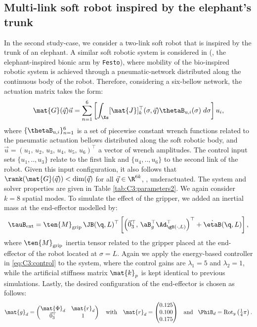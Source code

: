\subsection{Multi-link soft robot inspired by the elephant's trunk}
In the second study-case, we consider a two-link soft robot that is inspired by the trunk of an elephant. A similar soft robotic system is considered in \cite{Falkenhahn2015} (\ie, the elephant-inspired bionic arm by \texttt{Festo}), where mobility of the bio-inspired robotic system is achieved through a pneumatic-network distributed along the continuous body of the robot. Therefore, considering a six-bellow network, the actuation matrix takes the form:
%
\begin{equation*}
\mat{G}(\vec{q})\vec{u} = \sum_{n=1}^6 \left[ \int_\Xs [\mat{J}]_k^\top(\sigma,\vec{q}) \thetaB_{\textrm{u},i}(\sigma)\; d\sigma\right] u_i,
\end{equation*}
%
where $\{\thetaB_{\textrm{u},i}\}_{n=1}^6$ is a set of piecewise constant wrench functions related to the pneumatic actuation bellows distributed along the soft robotic body, and $\vec{u} = (u_1,\,u_2,\,u_3,\,u_4,\,u_5,\,u_6)^\top$ a vector of wrench amplitudes. The control input sets $\{u_1,..,u_3\}$ relate to the first link and $\{u_4,..,u_6\}$ to the second link of the robot. Given this input configuration, it also follows that $\rank(\mat{G}(\vec{q})) < \dim(\vec{q})$ for all $\vec{q} \in \R^{6k}$, \ie, underactuated. The system and solver properties are given in Table \ref{tab:C3:parameters2}. We again consider $k=8$ spatial modes. To simulate the effect of the gripper, we added an inertial mass at the end-effector modelled by:
%
$$\tauB_{\textrm{ext}} =  \ten{M}_{\textrm{grip}}\,\JB(\q,L)^\top \left[ \left(\vec{0}_3^\top,\, \aB_g ^\top \Ad^\top_{\gB(\cdot,L)} \right)^\top + \dot{\etaB}(\q,L) \right],$$
%
where $\ten{M}_{\textrm{grip}}$ inertia tensor related to the gripper placed at the end-effector of the robot located at $\sigma = L$. Again we apply the energy-based controller in \eqref{eq:C3:control} to the system, where the control gains are $\lambda_1 = 5$ and $\lambda_2 = 1$, while the artificial stiffness matrix $\mat{k}_p$ is kept identical to previous simulations. Lastly, the desired configuration of the end-effector is chosen as follows:
%
\begin{equation*}
\mat{g}_d = \begin{pmatrix} \mat{\Phi}_d & \mat{r}_d \\ \vec{0}_3^\top & 1 \end{pmatrix} \quad \text{with} \quad \mat{r}_d = \begin{pmatrix}  0.125 \\ 0.100 \\ 0.175  \end{pmatrix} \;\;\;\text{and} \;\;\; \PhiB_d = \textrm{Rot}_y\left(\tfrac{1}{4}\pi \right).
\end{equation*}
%

